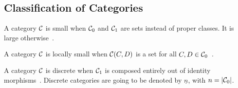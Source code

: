 \subsection{Classification of Categories}

\begin{definition}

  A category $\mathcal{C}$ is small when $\mathcal{C}_0$ and $\mathcal{C}_1$ are sets instead of proper
  classes. It is large otherwise~\parencite[p.~24]{awodey:category_theory}.
\end{definition}

\begin{definition}

  A category $\mathcal{C}$ is locally small when $\mathcal{C}(C, D)$ is a set for all $C,D\in
  \mathcal{C}_0$~\parencite[p.~25]{awodey:category_theory}.
\end{definition}

\begin{definition}

  A category $\mathcal{C}$ is discrete when $\mathcal{C}_1$ is composed entirely out of identity
  morphisms~\parencite[p.~11]{awodey:category_theory}. Discrete categories are
  going to be denoted by $\underline{n}$, with $n=|\mathcal{C}_0|$.
\end{definition}

\newpage